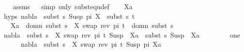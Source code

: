 \begin{isabellebody}
%
\isadelimproof
\ \ %
\endisadelimproof
%
\isatagproof
{}\isamarkupfalse%
\ assms\isanewline
\ \ \isamarkupfalse%
{\isacharparenleft}{\kern0pt}simp\ only{\isacharcolon}{\kern0pt}\ subst{\isacharunderscore}{\kern0pt}equ{\isacharunderscore}{\kern0pt}def{\isacharparenright}{\kern0pt}\isanewline
{}\isamarkupfalse%
\isanewline
\ \ \isamarkupfalse%
\ Xa\isanewline
\ \ \isamarkupfalse%
\ hyps{\isacharcolon}{\kern0pt}\ {\isachardoublequoteopen}nabla\ {\isasymturnstile}\ subst\ s\ {\isacharparenleft}{\kern0pt}Susp\ pi\ X{\isacharparenright}{\kern0pt}\ {\isasymapprox}\ subst\ s\ t{\isachardoublequoteclose}\isanewline
\ \ \ {\isachardoublequoteopen}Xa\ {\isasymin}\ domn\ {\isacharparenleft}{\kern0pt}subst\ {\isacharparenleft}{\kern0pt}s\ {\isasymbullet}\ {\isacharbrackleft}{\kern0pt}{\isacharparenleft}{\kern0pt}X{\isacharcomma}{\kern0pt}\ swap\ {\isacharparenleft}{\kern0pt}rev\ pi{\isacharparenright}{\kern0pt}\ t{\isacharparenright}{\kern0pt}{\isacharbrackright}{\kern0pt}{\isacharparenright}{\kern0pt}{\isacharparenright}{\kern0pt}\ {\isasymunion}\ domn\ {\isacharparenleft}{\kern0pt}subst\ s{\isacharparenright}{\kern0pt}{\isachardoublequoteclose}\isanewline
\ \ \isamarkupfalse%
\ {\isachardoublequoteopen}nabla\ {\isasymturnstile}\ subst\ {\isacharparenleft}{\kern0pt}s\ {\isasymbullet}\ {\isacharbrackleft}{\kern0pt}{\isacharparenleft}{\kern0pt}X{\isacharcomma}{\kern0pt}\ swap\ {\isacharparenleft}{\kern0pt}rev\ pi{\isacharparenright}{\kern0pt}\ t{\isacharparenright}{\kern0pt}{\isacharbrackright}{\kern0pt}{\isacharparenright}{\kern0pt}\ {\isacharparenleft}{\kern0pt}Susp\ {\isacharbrackleft}{\kern0pt}{\isacharbrackright}{\kern0pt}\ Xa{\isacharparenright}{\kern0pt}\ {\isasymapprox}\ subst\ s\ {\isacharparenleft}{\kern0pt}Susp\ {\isacharbrackleft}{\kern0pt}{\isacharbrackright}{\kern0pt}\ Xa{\isacharparenright}{\kern0pt}{\isachardoublequoteclose}\isanewline
\ \ \isamarkupfalse%
{\isacharminus}{\kern0pt}\isanewline
\ \ \ \ \isamarkupfalse%
\ one{\isacharcolon}{\kern0pt}\ \isanewline
\ \ \ \ \ \ {\isachardoublequoteopen}nabla\ {\isasymturnstile}\ subst\ {\isacharparenleft}{\kern0pt}s\ {\isasymbullet}\ {\isacharbrackleft}{\kern0pt}{\isacharparenleft}{\kern0pt}X{\isacharcomma}{\kern0pt}\ swap\ {\isacharparenleft}{\kern0pt}rev\ pi{\isacharparenright}{\kern0pt}\ t{\isacharparenright}{\kern0pt}{\isacharbrackright}{\kern0pt}{\isacharparenright}{\kern0pt}\ {\isacharparenleft}{\kern0pt}Susp\ pi\ Xa{\isacharparenright}{\kern0pt}\ {\isasymapprox}\ \isanewline

\end{isabellebody}
